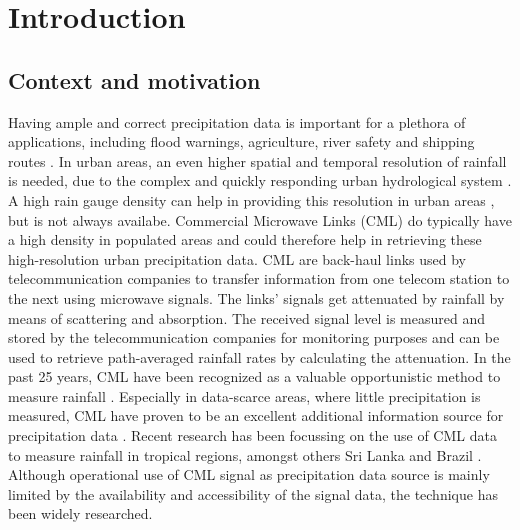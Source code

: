\documentclass[twocolumn, 10pt, a4paper]{memoir}
\begin{document}
	\cleardoublepage
	
	
	
	\cleardoublepage
	
	\pagestyle{ruled}
	\mainmatter          
	
	\chapter{Introduction}\vspace{-6mm}
	\section{Context and motivation}
	
	Having ample and correct precipitation data is important for a plethora of applications, including flood warnings, agriculture, river safety and shipping routes . In urban areas, an even higher spatial and temporal resolution of rainfall is needed, due to the complex and quickly responding urban hydrological system . A high rain gauge density can help in providing this resolution in urban areas , but is not always availabe. Commercial Microwave Links (CML) do typically have a high density in populated areas and could therefore help in retrieving these high-resolution urban precipitation data. CML are back-haul links used by telecommunication companies to transfer information from one telecom station to the next using microwave signals. The links' signals get attenuated by rainfall by means of scattering and absorption. The received signal level is measured and stored by the telecommunication companies for monitoring purposes and can be used to retrieve path-averaged rainfall rates by calculating the attenuation. In the past 25 years, CML have been recognized as a valuable opportunistic method to measure rainfall . Especially in data-scarce areas, where little precipitation is measured, CML have proven to be an excellent additional information source for precipitation data . Recent research has been focussing on the use of CML data to measure rainfall in tropical regions, amongst others Sri Lanka \cite{Overeem2021} and Brazil \cite{RiosGaona2017a}. Although operational use of CML signal as precipitation data source is mainly limited by the availability and accessibility of the signal data, the technique has been widely researched.
	
\end{document}
